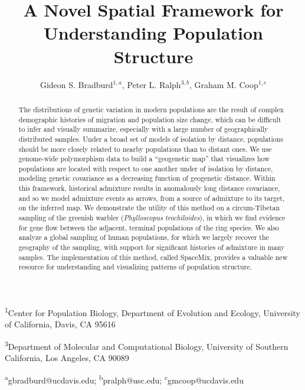 \documentclass[12pt]{article}
\title{A Novel Spatial Framework for Understanding Population Structure}
\date{\vspace{-5ex}}
\author{Gideon S. Bradburd$^{1,a}$, Peter L. Ralph$^{3,b}$, Graham M. Coop$^{1,c}$}
\begin{document}
\maketitle

\textsuperscript{1}Center for Population Biology, Department of Evolution and Ecology, University of California, Davis, CA 95616

\textsuperscript{3}Department of Molecular and Computational Biology, University of Southern California, Los Angeles, CA 90089

\textsuperscript{a}gbradburd@ucdavis.edu; 
\textsuperscript{b}pralph@usc.edu;
\textsuperscript{c}gmcoop@ucdavis.edu\\\\\

\newpage
 

\begin{abstract}
The distributions of genetic variation in modern populations 
are the result of 
complex demographic histories of migration and population size change,
which can be difficult to infer and visually summarize,
especially with a large number of geographically distributed samples.
Under a broad set of models of isolation by distance, 
populations should be more closely related to nearby populations than to distant ones.
We use genome-wide polymorphism data to build a ``geogenetic map''
that visualizes how populations are located with respect to one another under of isolation by distance, 
modeling genetic covariance as a decreasing function of geogenetic distance. 
Within this framework, 
historical admixture results in anomalously long distance covariance,
and so we model admixture events as arrows, from a source of admixture to its target, on the inferred map.  
We demonstrate the utility of this method on a circum-Tibetan sampling of the greenish warbler (\textit{Phylloscopus trochiloides}), in which we find evidence for gene flow between the adjacent, terminal populations of the ring species.  
We also analyze a global sampling of human populations, for which we largely recover the geography of the sampling, with support for significant histories of admixture in many samples.  The implementation of this method, 
called SpaceMix, provides a valuable new resource for understanding and visualizing patterns of population structure.
\end{abstract}

\newpage
\end{document}

